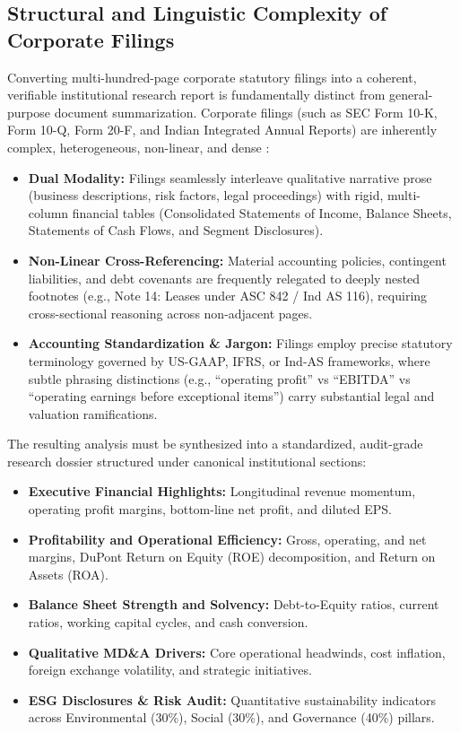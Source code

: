 \documentclass[conference]{IEEEtran}
\begin{document}
\subsection{Structural and Linguistic Complexity of Corporate Filings}
Converting multi-hundred-page corporate statutory filings into a coherent, verifiable institutional research report is fundamentally distinct from general-purpose document summarization. Corporate filings (such as SEC Form 10-K, Form 10-Q, Form 20-F, and Indian Integrated Annual Reports) are inherently complex, heterogeneous, non-linear, and dense \cite{chen2021finqa, islam2023financebench}:
\begin{itemize}
    \item \textbf{Dual Modality:} Filings seamlessly interleave qualitative narrative prose (business descriptions, risk factors, legal proceedings) with rigid, multi-column financial tables (Consolidated Statements of Income, Balance Sheets, Statements of Cash Flows, and Segment Disclosures).
    \item \textbf{Non-Linear Cross-Referencing:} Material accounting policies, contingent liabilities, and debt covenants are frequently relegated to deeply nested footnotes (e.g., Note 14: Leases under ASC 842 / Ind AS 116), requiring cross-sectional reasoning across non-adjacent pages.
    \item \textbf{Accounting Standardization \& Jargon:} Filings employ precise statutory terminology governed by US-GAAP, IFRS, or Ind-AS frameworks, where subtle phrasing distinctions (e.g., ``operating profit'' vs ``EBITDA'' vs ``operating earnings before exceptional items'') carry substantial legal and valuation ramifications.
\end{itemize}

The resulting analysis must be synthesized into a standardized, audit-grade research dossier structured under canonical institutional sections:
\begin{itemize}
    \item \textbf{Executive Financial Highlights:} Longitudinal revenue momentum, operating profit margins, bottom-line net profit, and diluted EPS.
    \item \textbf{Profitability and Operational Efficiency:} Gross, operating, and net margins, DuPont Return on Equity (ROE) decomposition, and Return on Assets (ROA).
    \item \textbf{Balance Sheet Strength and Solvency:} Debt-to-Equity ratios, current ratios, working capital cycles, and cash conversion.
    \item \textbf{Qualitative MD\&A Drivers:} Core operational headwinds, cost inflation, foreign exchange volatility, and strategic initiatives.
    \item \textbf{ESG Disclosures \& Risk Audit:} Quantitative sustainability indicators across Environmental (30\%), Social (30\%), and Governance (40\%) pillars.
\end{itemize}
\end{document}
